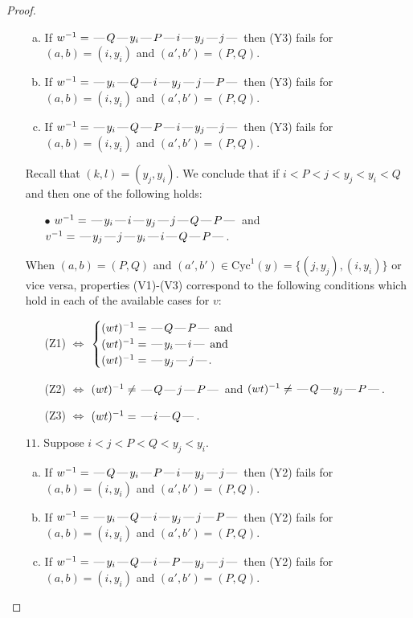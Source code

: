 \documentclass[10pt]{article}
\theoremstyle{definition}
\theoremstyle{definition}
\def\dash{\text{\hspace{0.5mm}---\hspace{0.5mm}}}
\def\Cyc{\mathrm{Cyc}}
\begin{document}
\begin{proof}
\begin{enumerate}
\begin{enumerate}[(a)]
\item If $w^{-1} = \dash Q\dash y_i\dash P\dash i\dash y_j\dash j\dash $ then (Y3) fails for $(a,b)=(i,y_i)$ and $(a',b')=(P,Q)$.
\item If $w^{-1} = \dash y_i\dash Q\dash i\dash y_j\dash j\dash P\dash $ then (Y3) fails for $(a,b)=(i,y_i)$ and $(a',b')=(P,Q)$.
\item If $w^{-1} = \dash y_i\dash Q\dash P\dash i\dash y_j\dash j\dash $ then (Y3) fails for $(a,b)=(i,y_i)$ and $(a',b')=(P,Q)$.
\end{enumerate}
Recall that $(k,l) = (y_j,y_i)$.
We conclude that if $i < P < j < y_j < y_i < Q$ and then one of the following holds:
\begin{enumerate}
\item[$\bullet$] $w^{-1} = \dash y_i\dash i\dash y_j\dash j\dash Q\dash P\dash $ and $v^{-1} = \dash y_j\dash j\dash y_i\dash i\dash Q\dash P\dash $.
\end{enumerate}
When $(a,b)= (P,Q)$ and $(a',b')\in \Cyc^1(y)=\{(j,y_j),(i,y_i)\}$ or vice versa,
properties (V1)-(V3) correspond to the following conditions which hold in
each of the available cases for $v$:
\begin{enumerate}
\item[](Z1) $\Leftrightarrow$ $\begin{cases}\text{$(wt)^{-1} = \dash Q \dash P \dash$}\text{ and }\\
\text{$(wt)^{-1} = \dash y_i \dash i \dash$}\text{ and }\\
\text{$(wt)^{-1} = \dash y_j \dash j \dash$}.\end{cases}$
\item[](Z2) $\Leftrightarrow$ $(wt)^{-1} \neq \dash Q \dash j \dash P \dash$ and $(wt)^{-1}\neq \dash Q \dash y_j \dash P \dash$.
\item[](Z3) $\Leftrightarrow$ $(wt)^{-1} = \dash i \dash Q \dash$.
\end{enumerate}
\item[$11$.] Suppose $i < j < P < Q < y_j < y_i$.
\begin{enumerate}[(a)]
\item If $w^{-1} = \dash Q\dash y_i\dash P\dash i\dash y_j\dash j\dash $ then (Y2) fails for $(a,b)=(i,y_i)$ and $(a',b')=(P,Q)$.
\item If $w^{-1} = \dash y_i\dash Q\dash i\dash y_j\dash j\dash P\dash $ then (Y2) fails for $(a,b)=(i,y_i)$ and $(a',b')=(P,Q)$.
\item If $w^{-1} = \dash y_i\dash Q\dash i\dash P\dash y_j\dash j\dash $ then (Y2) fails for $(a,b)=(i,y_i)$ and $(a',b')=(P,Q)$.

\end{enumerate}
\end{enumerate}
\end{proof}
\end{document}
